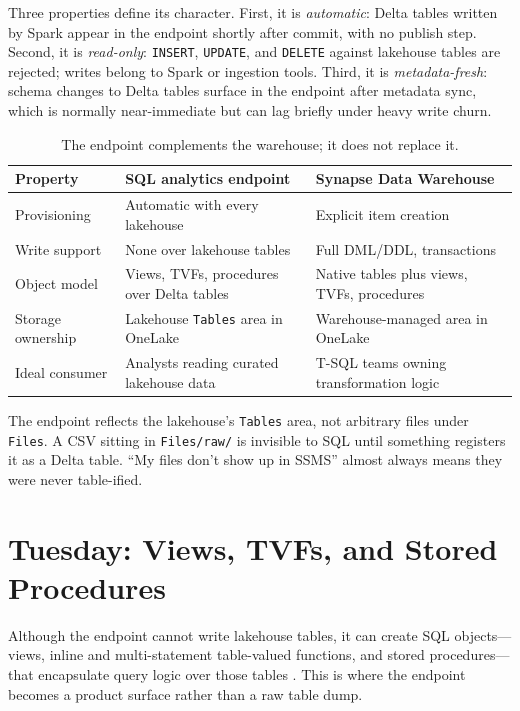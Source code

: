 Three properties define its character. First, it is \emph{automatic}: Delta tables written by Spark appear in the endpoint shortly after commit, with no publish step. Second, it is \emph{read-only}: \texttt{INSERT}, \texttt{UPDATE}, and \texttt{DELETE} against lakehouse tables are rejected; writes belong to Spark or ingestion tools. Third, it is \emph{metadata-fresh}: schema changes to Delta tables surface in the endpoint after metadata sync, which is normally near-immediate but can lag briefly under heavy write churn.

\begin{table}[H]
\centering
\small
\begin{tabular}{@{}p{4.2cm}p{5.0cm}p{4.8cm}@{}}
\toprule
\textbf{Property} & \textbf{SQL analytics endpoint} & \textbf{Synapse Data Warehouse} \\
\midrule
Provisioning & Automatic with every lakehouse & Explicit item creation \\
Write support & None over lakehouse tables & Full DML/DDL, transactions \\
Object model & Views, TVFs, procedures over Delta tables & Native tables plus views, TVFs, procedures \\
Storage ownership & Lakehouse \texttt{Tables} area in OneLake & Warehouse-managed area in OneLake \\
Ideal consumer & Analysts reading curated lakehouse data & T-SQL teams owning transformation logic \\
\bottomrule
\end{tabular}
\caption{The endpoint complements the warehouse; it does not replace it.}
\label{tab:chapter6-endpoint-vs-wh}
\end{table}

\begin{pitfall}
The endpoint reflects the lakehouse's \texttt{Tables} area, not arbitrary files under \texttt{Files}. A CSV sitting in \texttt{Files/raw/} is invisible to SQL until something registers it as a Delta table. ``My files don't show up in SSMS'' almost always means they were never table-ified.
\end{pitfall}

\section{Tuesday: Views, TVFs, and Stored Procedures}
Although the endpoint cannot write lakehouse tables, it can create SQL objects---views, inline and multi-statement table-valued functions, and stored procedures---that encapsulate query logic over those tables \cite{microsoftFabricSqlEndpoint}. This is where the endpoint becomes a product surface rather than a raw table dump.


